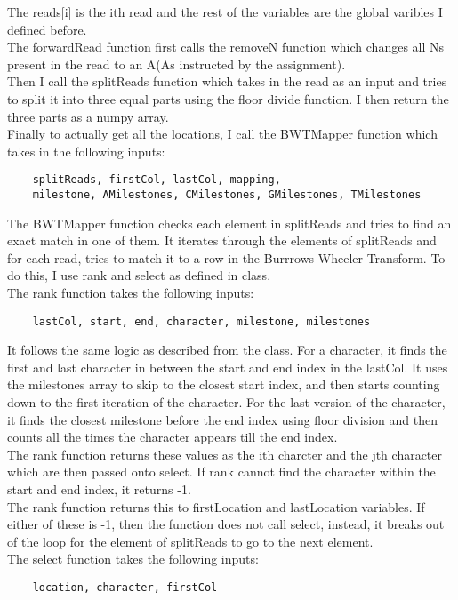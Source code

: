\documentclass[12pt]{article}
\begin{document}
The reads[i] is the ith read and the rest of the variables are the global varibles I defined before.\\
The forwardRead function first calls the removeN function which changes all Ns present in the read to an A(As instructed by the assignment).\\
Then I call the splitReads function which takes in the read as an input and tries to split it into three equal parts using the floor divide function. I then return the three parts as a numpy array.\\
Finally to actually get all the locations, I call the BWTMapper function which takes in the following inputs:
\begin{verbatim}
    splitReads, firstCol, lastCol, mapping,
    milestone, AMilestones, CMilestones, GMilestones, TMilestones
\end{verbatim}
The BWTMapper function checks each element in splitReads and tries to find an exact match in one of them. It iterates through the elements of splitReads and for each read, tries to match it to a row in the Burrrows Wheeler Transform. To do this, I use rank and select as defined in class.\\
The rank function takes the following inputs:\\
\begin{verbatim}
    lastCol, start, end, character, milestone, milestones
\end{verbatim}
It follows the same logic as described from the class. For a character, it finds the first and last character in between the start and end index in the lastCol. It uses the milestones array to skip to the closest start index, and then starts counting down to the first iteration of the character. For the last version of the character, it finds the closest milestone before the end index using floor division and then counts all the times the character appears till the end index.\\
The rank function returns these values as the ith charcter and the jth character which are then passed onto select. If rank cannot find the character within the start and end index, it returns -1.\\
The rank function returns this to firstLocation and lastLocation variables. If either of these is -1, then the function does not call select, instead, it breaks out of the loop for the element of splitReads to go to the next element.\\
The select function takes the following inputs:
\begin{verbatim}
    location, character, firstCol
\end{verbatim}
\end{document}
